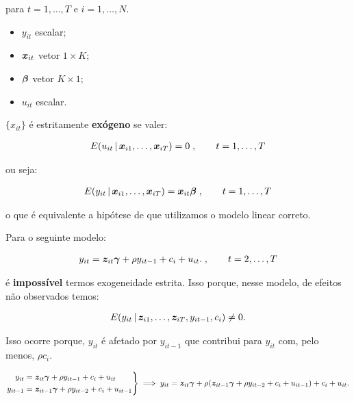 \documentclass[11pt,oneside,a4paper]{article}
\numberwithin{equation}{section}
\begin{document}
\begin{description}
\begin{description}
\noindent
para
$t = 1, \dots, T$ e $i = 1, \dots, N$.

\begin{itemize}\itemsep0pt
\item
$y_{it}$ escalar;

\item
$\boldsymbol{x}_{it}$  vetor $1 \times K$;

\item
$\boldsymbol{\beta}$ vetor $K \times 1$;

\item
$u_{it}$ escalar.
\end{itemize}

\noindent
$\{x_{it}\}$ é estritamente \textbf{exógeno} se valer:

\vspace{-1 em}
\begin{align*}
	E( u_{it} \, | \, \boldsymbol{x}_{i1}, \dots, \boldsymbol{x}_{iT} ) = 0 \; , \qquad t = 1, \dots, T
\end{align*}

\noindent
ou seja:

\vspace{-1 em}
\begin{align*}
E( y_{it} \, | \, \boldsymbol{x}_{i1}, \dots, \boldsymbol{x}_{iT} ) = \boldsymbol{x}_{it} \boldsymbol{\beta} 
\; , \qquad t = 1, \dots, T
\end{align*}

\noindent
o que é equivalente a hipótese de que utilizamos o modelo linear correto.

Para o seguinte modelo:

\vspace{-1.5 em}
\begin{align*}
y_{it} = \boldsymbol{z}_{it} \boldsymbol{\gamma} + \rho y_{i t - 1} + c_{i} + u_{it}.
\; , \qquad t = 2, \dots, T
\end{align*}

\noindent
é \textbf{impossível} termos exogeneidade estrita.
Isso porque, nesse modelo, de efeitos não observados temos:

\vspace{-1.5 em}
\begin{align*}
	E( y_{it} \, | \, \boldsymbol{z}_{i1}, \dots, \boldsymbol{z}_{iT}, y_{it-1}, c_{i}) \neq 0.
\end{align*}

\noindent
Isso ocorre porque, $y_{it}$ é afetado por $y_{it-1}$ que contribui para $y_{it}$ com, pelo menos, $\rho c_{i}$.

\begin{equation*}
\left.
\begin{aligned}
y_{it} &= \boldsymbol{z}_{it} \boldsymbol{\gamma} + \rho y_{i t - 1} + c_{i} + u_{it}
\\
y_{it-1} &= \boldsymbol{z}_{it-1} \boldsymbol{\gamma} + \rho y_{i t - 2} + c_{i} + u_{it-1}
\end{aligned}
\right\} 
\implies
y_{it} = \boldsymbol{z}_{it} \boldsymbol{\gamma} +
\rho (\boldsymbol{z}_{it-1} \boldsymbol{\gamma} + \rho y_{i t - 2} + c_{i} + u_{it-1})
+ c_{i} + u_{it}.
\end{equation*}


\end{description}
\end{description}
\end{document}
